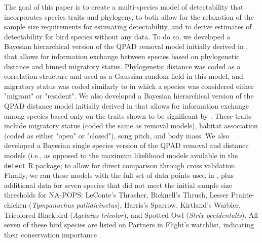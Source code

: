 \documentclass[12pt]{article}
\begin{document}
\par The goal of this paper is to create a multi-species model of detectability that incorporates species traits and phylogeny, to both allow for the relaxation of the sample size requirements for estimating detectability, and to derive estimates of detectability for bird species without any data.
To do so, we developed a Bayesian hierarchical version of the QPAD removal model initially derived in \citet{solymos_calibrating_2013}, that allows for information exchange between species based on phylogenetic distance and binned migratory status. 
Phylogenetic distance was coded as a correlation structure and used as a Gaussian random field in this model, and migratory status was coded similarly to \citet{solymos_phylogeny_2018} in which a species was considered either "migrant" or "resident". 
We also developed a Bayesian hierarchical version of the QPAD distance model initially derived in \citet{solymos_calibrating_2013} that allows for information exchange among species based only on the traits shown to be significant by \citet{solymos_phylogeny_2018}.
These traits include migratory status (coded the same as removal models), habitat association (coded as either "open" or "closed"), song pitch, and body mass. 
We also developed a Bayesian single species version of the QPAD removal and distance models (i.e., as opposed to the maximum likelihood models available in the \texttt{detect} R package; \citet{solymos_detect_2020} to allow for direct comparison through cross validation.
Finally, we ran these models with the full set of data points used in \citet{edwards_point_2023}, plus additional data for seven species that did not meet the initial sample size thresholds for NA-POPS: LeConte's Thrasher, Bicknell's Thrush, Lesser Prairie-chicken (\textit{Tympanuchus pallidicinctus}), Harris's Sparrow, Kirtland's Warbler, Tricolored Blackbird (\textit{Agelaius tricolor}), and Spotted Owl (\textit{Strix occidentalis}). 
All seven of these bird species are listed on Partners in Flight’s watchlist, indicating their conservation importance \citep{will_handbook_2020}. 
\end{document}

